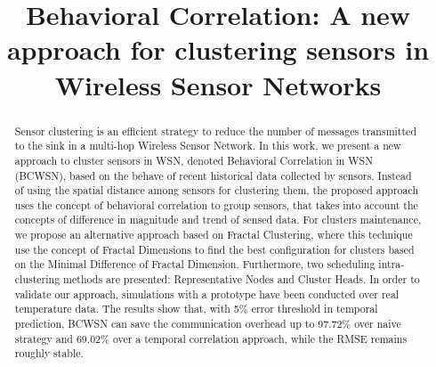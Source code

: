 \documentclass[conference]{IEEEtran}
\begin{document}
%

\title{Behavioral Correlation: A new approach for clustering sensors in Wireless Sensor Networks}

\author{
\and
{}
\and
{}
}


\maketitle


\begin{abstract}

Sensor clustering is an efficient strategy to reduce the number of messages
transmitted to the sink in a multi-hop Wireless Sensor Network.
In this work, we present a new approach to cluster sensors in WSN, denoted
Behavioral Correlation in WSN (BCWSN), based on the behave of recent historical
data collected by sensors. Instead of using the spatial distance among sensors
for clustering them, the proposed approach uses the concept of behavioral
correlation to group sensors, that takes into account the concepts of difference
in magnitude and trend of sensed data. For clusters maintenance, we propose
an alternative approach based on Fractal Clustering, where this technique use
the concept of Fractal Dimensions to find the best configuration for clusters
based on the Minimal Difference of Fractal Dimension.
Furthermore, two scheduling intra-clustering methods are presented:
Representative Nodes and Cluster Heads.
In order to validate our approach, simulations with a prototype have been
conducted over real temperature data. The results show that, with 5\% error
threshold in temporal prediction, BCWSN can save the communication overhead up
to 97.72\% over naive strategy and 69.02\% over a temporal correlation approach,
while the RMSE remains roughly stable.



\end{abstract}
\end{document}
